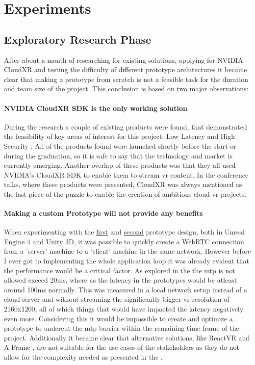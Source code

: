 \section{Experiments}

\subsection{Exploratory Research Phase}
After about a month of researching for existing solutions, applying for NVIDIA CloudXR \parencite{cloudxr} and testing the difficulty of different prototype architectures it became clear that making a prototype from scratch is not a feasible task for the duration and team size of the project. This conclusion is based on two major observations:

\paragraph{NVIDIA CloudXR SDK is the only working solution}
During the research a couple of existing products were found, that demonstrated the feasibility of key areas of interest for this project: Low Latency and High Security \parencite{gtc2020esi}. All of the products found were launched shortly before the start or during the graduation, so it is safe to say that the technology and market is currently emerging. Another overlap of these products was that they all used NVIDIA's CloudXR SDK to enable them to stream \acrshort{vr} content. In the conference talks, where these products were presented, CloudXR was always mentioned as the last piece of the puzzle to enable the creation of ambitions cloud \acrshort{vr} projects.

\paragraph{Making a custom Prototype will not provide any benefits}
When experimenting with the \hyperref[fig:pr11]{first} and \hyperref[fig:pr12]{second} prototype design, both in Unreal Engine 4 and Unity 3D, it was possible to quickly create a WebRTC connection from a 'server' machine to a 'client' machine in the same network. However before I ever got to implementing the whole application loop it was already evident that the performance would be a critical factor. As explored in the  the \acrfull{mtp} is not allowed exceed 20\acrshort{ms}, where as the latency in the prototypes would be atleast around 100\acrshort{ms} normally. This was measured in a local network setup instead of a cloud server and without streaming the significantly bigger \acrshort{vr} resolution of 2160x1200, all of which things that would have impacted the latency negatively even more. Considering this it would be impossible to create and optimize a prototype to undercut the \acrshort{mtp} barrier within the remaining time frame of the project. Additionally it became clear that alternative solutions, like ReactVR \parencite{reactVR} and A-Frame \parencite{aframe}, are not suitable for the use-cases of the stakeholders as they do not allow for the complexity needed as presented in the . \\

